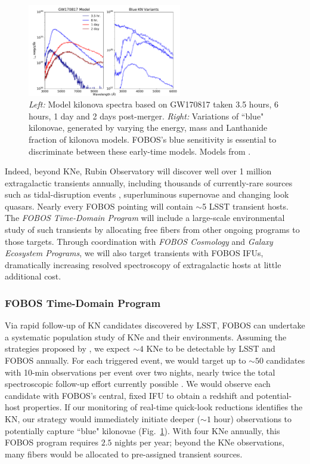 \documentclass[11pt,a4paper,twoside,onecolumn,openany,final,oldfontcommands]{memoir}
\begin{document}
\begin{figure}%
\includegraphics[width=0.6\textwidth]{figs/kn_fobos.pdf}
\caption{\textit{Left:} Model kilonova spectra based on GW170817 taken 3.5 hours, 6 hours, 1 day and 2 days post-merger. \textit{Right:} Variations of ``blue" kilonovae, generated by varying the energy, mass and Lanthanide fraction of kilonova models. FOBOS's blue sensitivity is essential to discriminate between these early-time models. Models from \citet{kasen2017}.}
\label{fig:kilonova}    
\end{figure}

Indeed, beyond KNe, Rubin Observatory will discover well over 1 million extragalactic transients annually, including thousands of currently-rare sources such as tidal-disruption events \citep{bricman2020}, superluminous supernovae \citep{villar2018} and changing look quasars. Nearly every FOBOS pointing will contain $\sim$5 LSST transient hosts.  The {\it FOBOS Time-Domain Program} will include a large-scale environmental study of such transients by allocating free fibers from other ongoing programs to those targets.  Through coordination with {\it FOBOS Cosmology} and {\it Galaxy Ecosystem Programs}, we will also target transients with FOBOS IFUs, dramatically increasing resolved spectroscopy of extragalactic hosts \citep[see a recent review by][]{anderson2015} at little additional cost. 



\subsubsection{FOBOS Time-Domain Program}

Via rapid follow-up of KN candidates discovered by LSST, FOBOS can undertake a systematic population study of KNe and their environments. Assuming the strategies proposed by \citet{margutti2018}, we expect $\sim4$ KNe to be detectable by LSST and FOBOS annually. For each triggered event, we would target up to $\sim50$ candidates with 10-min observations per event over two nights, nearly twice the total spectroscopic follow-up effort currently possible \citep{hosseinzadeh2019}. We would observe each candidate with FOBOS's central, fixed IFU to obtain a redshift and potential-host properties.  If our monitoring of real-time quick-look reductions identifies the KN, our strategy would immediately initiate deeper ($\sim1$ hour) observations to potentially capture ``blue" kilonovae (Fig.~\ref{fig:kilonova}).  With four KNe annually, this FOBOS program requires $2.5$ nights per year; beyond the KNe observations, many fibers would be allocated to pre-assigned transient sources.
\end{document}
